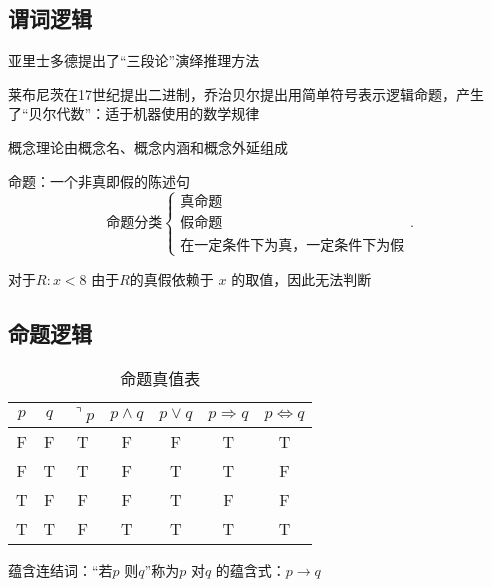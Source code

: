 \subsection{谓词逻辑}%
\label{sub:谓词逻辑}
\begin{notation}
    亚里士多德提出了“三段论”演绎推理方法

    莱布尼茨在17世纪提出二进制，乔治贝尔提出用简单符号表示逻辑命题，产生了“贝尔代数”：适于机器使用的数学规律
\end{notation}
概念理论由概念名、概念内涵和概念外延组成
\begin{notation}
    命题：一个非真即假的陈述句
    \[
        \text{命题分类}
        \begin{cases}
            \text{真命题}\\
            \text{假命题}\\
            \text{在一定条件下为真，一定条件下为假}
        \end{cases}
    .\] 

    对于$R: x<8$ 由于$R$的真假依赖于 $x$ 的取值，因此无法判断
\end{notation}
\subsection{命题逻辑}%
\label{sub:命题逻辑}
\begin{table}[htpb]
    \centering
    \caption{命题真值表}
    \label{tab:命题真值表}
    \begin{tabular}{ccccccc}
    \toprule
    $p$ & $q$& $\urcorner p$& $p\land q$& $p\lor q$& $p\Rightarrow q$& $p\Leftrightarrow q$\\
    \midrule
    F&F&T&F&F&T&T\\
    F&T&T&F&T&T&F\\
    T&F&F&F&T&F&F\\
    T&T&F&T&T&T&T\\
    \bottomrule
    \end{tabular}
\end{table}
\begin{notation}
    蕴含连结词：“若$p$ 则$q$”称为$p$ 对$q$ 的蕴含式：$p\to q$
\end{notation}

